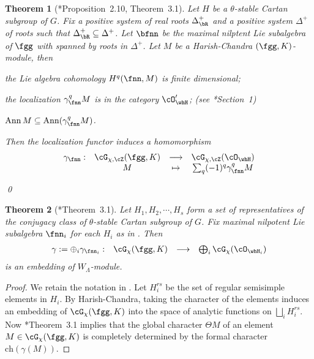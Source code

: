 \documentclass[12pt,a4paper]{amsart}
\DeclareMathOperator{\Ann}{Ann}
\numberwithin{equation}{section}
\newtheorem{thm}{Theorem}[section]
\theoremstyle{remark}
\def\WLam{W_{\Lambda}}
\begin{document}
\def\Grt{\cG}
\def\DeltaRp{\Delta^{+}_{\bR}}
\begin{thm}[\cite{Cas}*{Proposition~2.10, Theorem~3.1}]\label{thm:L1}
  Let $H$ be a $\theta$-stable Cartan subgroup of $G$.
  Fix a positive system of real roots $\DeltaRp$ and a positive system
  $\Delta^{+}$ of roots such that $\DeltaRp\subseteq \Delta^{+}$.
  Let $\bfnn$ be the maximal nilptent Lie subalgebra of $\fgg$ with spanned
  by roots in $\Delta^{+}$.
 Let $M$  be a Harish-Chandra $(\fgg,K)$-module, then
  \begin{enumT}
    \item the Lie algebra cohomology $H^{q}(\fnn,M)$ is finite dimensional;
    \item
    the localization $\gamma_{\fnn}^{q}M$ is in the category $\cO'_{\whH}$;
    (see \cite{Cas}*{Section~1})
    \item
    $\Ann M \subseteq \Ann (\gamma_{\fnn}^{q}M)$.
    \item
  Then the localization functor induces a homomorphism
  \[
    \begin{array}{cccc}
      \gamma_{\fnn}: &\Grt_{\chi,\cZ}(\fgg,K) &\longrightarrow & \Grt_{\chi,\cZ}(\cO_{\whH})\\
      & M &\mapsto & \sum_{q}  (-1)^{q} \gamma^{q}_{\fnn} M
    \end{array}
  \]
  \end{enumT}
  \qed
\end{thm}

\begin{thm}[\cite{Cas}*{Theorem~3.1}]
  Let $H_{1}, H_{2}, \cdots, H_{s}$ form a set of representatives of the
  conjugacy class of $\theta$-stable Cartan subgroup of $G$. Fix maximal
  nilpotent Lie subalgebra $\fnn_{i}$ for each $H_{i}$ as in .
  Then
  \[
    \begin{array}{cccc}
      \gamma:=\oplus_{i} \gamma_{\fnn_{i}}: &\Grt_{\chi}(\fgg,K)
      &\longrightarrow & \bigoplus_{i} \Grt_{\chi}(\cO_{\whH_{i}})\\
    \end{array}
  \]
  is an embedding of $\WLam$-module.
\end{thm}
\begin{proof}
  We retain the notation in \cite{Cas}.
  Let $H^{rs}_{i}$ be the set of regular semisimple elements in $H_{i}$. By
  Harish-Chandra, taking the character of the elements induces an embedding of
  $\Grt_{\chi}(\fgg,K)$ into the space of analytic functions on
  $\bigsqcup_{i} H^{rs}_{i}$. Now \cite{Cas}*{Theorem~3.1} implies that the
  global character $\Theta M$ of an element $M\in \Grt_{\chi}(\fgg,K)$ is
  completely determined by the formal character $\mathrm{ch}(\gamma(M))$.
\end{proof}
\end{document}

